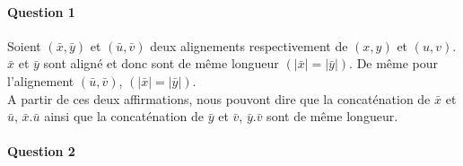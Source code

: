 \paragraph{Question 1}
Soient $(\bar x,\bar y)$ et $(\bar u, \bar v)$ deux alignements respectivement de $(x, y)$ et $(u, v)$. $\bar x$ et $\bar y$ sont aligné et donc sont de même longueur $(|\bar x| = |\bar y|)$. De même pour l'alignement $(\bar u, \bar v)$, $(|\bar x| = |\bar y|)$.\\
A partir de ces deux affirmations, nous pouvont dire que la concaténation de $\bar x$ et $\bar u$, $\bar x.\bar u$ ainsi que la concaténation de $\bar y$ et $\bar v$, $\bar y.\bar v$ sont de même longueur.

\paragraph{Question 2}
